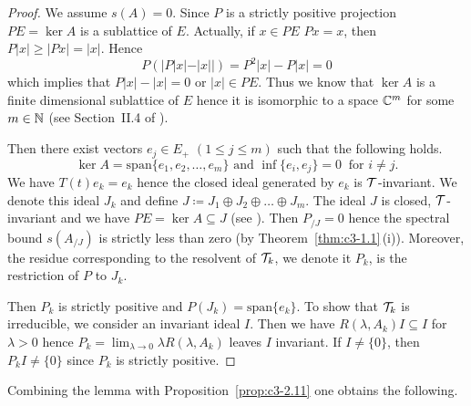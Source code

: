 \begin{proof}
We assume $s(A) = 0$. 
Since $P$ is a strictly positive projection $PE = \ker A$ is a sublattice of\/ $E$. 
Actually, if\/ $x \in PE$ \ie  $Px = x$, then $P|x| \geq |Px| = |x|$. 
Hence 
%
\[
	P(|P|x|-|x||) = P^{2}|x| - P|x| = 0
\]
%
which implies that $P|x| - |x| = 0$ or $|x| \in PE$.
Thus we know that $\ker A$ is a finite dimensional sublattice of\/ $E$ hence it is isomorphic to a space $\mathbb{C} ^{m}$ for some $m \in \mathbb{N}$ (see Section~II.4 of \textcite{schaefer:1974}). 
	
Then there exist vectors $e_{j} \in E_{+}$ $(1\leq j\leq m)$ such that the following holds.
\begin{equation}\label{eq:c3-3.18}
	\ker A = \mathrm{span} \{e_{1},e_{2}, \ldots ,e_{m}\} \text{ and } \inf\{e_{i},e_{j}\} = 0 \ \text{ for }  i \neq j .
\end{equation}
We have $T(t)e_{k} = e_{k}$ hence the closed ideal generated by $e_{k}$ is $\mathcal{T}$-invariant. 
We denote this ideal $J_{k}$ and define $J\coloneq  J_{1}\oplus J_{2}\oplus \ldots \oplus J_{m}$.
The ideal $J$ is closed, $\mathcal{T}$-invariant and we have $PE = \ker A \subseteq J$ (see \textcite[III Theorem~1.2]{schaefer:1974}). 
Then $P_{/J} = 0$ hence the spectral bound $s(A_{/J})$
	is strictly less than zero (by Theorem~\ref{thm:c3-1.1}\,(i)). 
	Moreover, the residue corresponding to the resolvent of\/ $\mathcal{T}_{k}$, we denote it $P_{k}$, is the restriction of\/ $P$ to $J_{k}$.
	
	Then $P_{k}$ is strictly positive and $P(J_{k}) = \mathrm{span}\{e_{k}\}$. 
	To show that $\mathcal{T}_{k}$ is irreducible, we consider an invariant ideal $I$. 
	Then we have $R(\lambda,A_{k})I \subseteq I$ for $\lambda > 0$ hence $P_{k} = \lim_{\lambda \to 0}\lambda R(\lambda,A_{k})$ leaves $I$ invariant. 
	If\/ $I \neq \{0\}$, then $P_{k}I \neq \{0\}$ since $P_{k}$ is strictly positive. 
\end{proof}
Combining the lemma with Proposition~\ref{prop:c3-2.11} one obtains the following.


